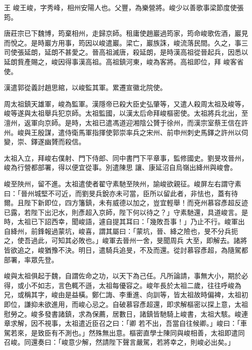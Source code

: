 
\begin{pinyinscope}

 王
 峻王峻，字秀峰，相州安陽人也。父豐，為樂營將。峻少以善歌事梁節度使張筠。



 唐莊宗已下魏博，筠棄相州，走歸京師。租庸使趙巖過筠家，筠命峻歌佐酒，巖見而悅之。是時巖方用事，筠因以峻遣巖。梁亡，巖族誅，峻流落民間。久之，事三司使張延朗，延朗不甚愛之。晉高祖滅唐，殺延朗，是時漢高祖從晉起兵，因悉以延朗貲產賜之，峻因得事漢高祖。高祖鎮河東，峻為客將。高祖即位，拜
 峻客省使。



 漢遣郭從義討趙思綰，以峻監其軍。累遷宣徽北院使。



 周太祖鎮天雄軍，峻為監軍。漢隱帝已殺大臣史弘肇等，又遣人殺周太祖及峻等，峻等遂與太祖舉兵犯京師。太祖監國，以漢太后命拜峻樞密使。太祖將兵北出，至澶州，返軍向京師。是時，太祖已遣馮道迎湘陰公贇于徐州，而漢宗室蔡王信在許州。峻與王殷謀，遣侍衛馬軍指揮使郭崇率兵之宋州、前申州刺史馬鐸之許州以伺變，崇、鐸遂幽贇而殺信。



 太祖入立，拜峻右僕射、門下侍郎、同中書門下平章事，監修國史。劉旻攻晉州，峻為行營都部署，得以便宜從事。別遣陳思
 讓、康延沼自烏嶺出絳州與峻會。



 峻至陜州，留不進。太祖遣使者翟守素馳至陜州，諭峻欲親征。峻屏左右謂守素曰：「晉州城堅不可近，而劉旻兵銳亦未可當，臣所以留此者，非怯也，蓋有待爾。且陛下新即位，四方籓鎮，未有威德以加之，豈宜輕舉！而兗州慕容彥超反迹已露，若陛下出汜水，則彥超入京師，陛下何以待之？」守素馳還，具道峻言。是時，太祖已下詔西幸，聞峻語，遽自提其耳曰：「幾敗吾事！」乃止不行。峻軍出自絳州，前鋒報過蒙坑，峻喜，謂其屬曰：「蒙坑，晉、絳之險也，旻不分兵扼之，使吾過此，可知其必敗也。」峻軍去晉州一舍，旻聞周兵
 大至，即解去。諸將皆欲追之，峻猶豫不決。明日，遣騎兵追旻，不及而還。從討慕容彥超，為隨駕都部署，率眾先登。



 峻與太祖俱起于魏，自謂佐命之功，以天下為己任。凡所論請，事無大小，期於必得，或小不如志，言色輒不遜，太祖每優容之。峻年長於太祖二歲，往往呼峻為兄，或稱其字，峻由是益橫。鄭仁誨、李重進、向訓等，皆太祖故時偏裨，太祖初即位，謙抑未欲進用，而峻心忌之。自破慕容彥超還，即求解樞密以探上意，太祖慰勞之。峻多發書諸鎮，求為保薦，居數日，諸鎮皆馳騎上峻書，太祖大駭。峻連章求解，因不視事，太祖遣近臣召之曰：「卿
 若不出，吾當自往候卿。」峻曰：「車駕若來，是致臣有不測也。」然殊無出意。樞密直學士陳同與峻相善，太祖即遣同召峻。同還奏曰：「峻意少解，然請陛下聲言嚴駕，若將幸之，則峻必出矣。」




\end{pinyinscope}
